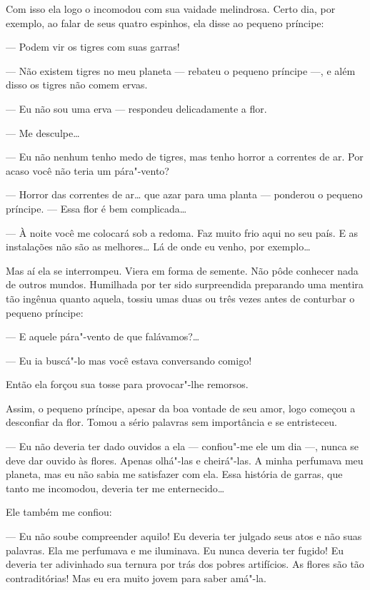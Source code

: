 \begin{Parallel}[p]{}{}
{Com isso ela logo o incomodou com sua vaidade melindrosa. Certo dia, por
exemplo, ao falar de seus quatro espinhos, ela disse ao pequeno
príncipe:

--- Podem vir os tigres com suas garras!

--- Não existem tigres no meu planeta --- rebateu o pequeno príncipe ---, e
além disso os tigres não comem ervas.

--- Eu não sou uma erva --- respondeu delicadamente a flor.

--- Me desculpe\ldots{}

--- Eu não nenhum tenho medo de tigres, mas tenho horror a correntes de
ar. Por acaso você não teria um pára"-vento?

--- Horror das correntes de ar\ldots{} que azar para uma planta --- ponderou o
pequeno príncipe. --- Essa flor é bem complicada\ldots{}

--- À noite você me colocará sob a redoma. Faz muito frio aqui no seu
país. E as instalações não são as melhores\ldots{} Lá de onde eu venho, por
exemplo\ldots{}

Mas aí ela se interrompeu. Viera em forma de semente. Não pôde conhecer
nada de outros mundos. Humilhada por ter sido surpreendida preparando
uma mentira tão ingênua quanto aquela, tossiu umas duas ou três vezes
antes de conturbar o pequeno príncipe:

--- E aquele pára"-vento de que falávamos?\ldots{}

--- Eu ia buscá"-lo mas você estava conversando comigo!

Então ela forçou sua tosse para provocar"-lhe remorsos.

Assim, o pequeno príncipe, apesar da boa vontade de seu amor, logo
começou a desconfiar da flor. Tomou a sério palavras sem importância e
se entristeceu.

--- Eu não deveria ter dado ouvidos a ela --- confiou"-me ele um dia ---,
nunca se deve dar ouvido às flores. Apenas olhá"-las e cheirá"-las. A
minha perfumava meu planeta, mas eu não sabia me satisfazer com ela.
Essa história de garras, que tanto me incomodou, deveria ter me
enternecido\ldots{}

Ele também me confiou:

--- Eu não soube compreender aquilo! Eu deveria ter julgado seus atos e
não suas palavras. Ela me perfumava e me iluminava. Eu nunca deveria ter
fugido! Eu deveria ter adivinhado sua ternura por trás dos pobres
artifícios. As flores são tão contraditórias! Mas eu era muito jovem
para saber amá"-la.

}
\end{Parallel}
